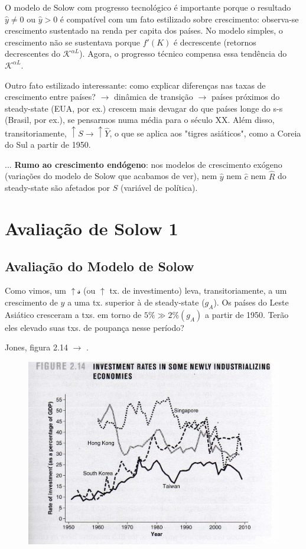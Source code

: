 \documentclass[a4paper,12pt]{article}[abntex2]
\begin{document}
O modelo de Solow com progresso tecnológico é importante porque o resultado \(\hat{y} \neq 0\) ou \(\hat{y} > 0\) é compatível com um fato estilizado sobre crescimento: observa-se crescimento sustentado na renda per capita dos países. No modelo simples, o crescimento não se sustentava porque \( f'(K) \) é decrescente (retornos decrescentes do \( \mathcal{K}^{\alpha L} \)). Agora, o progresso técnico compensa essa tendência do \( \mathcal{K}^{\alpha L} \).

Outro fato estilizado interessante: como explicar diferenças nas taxas de crescimento entre países? \(\rightarrow\) dinâmica de transição \(\rightarrow\) países próximos do steady-state (EUA, por ex.) crescem mais devagar do que países longe do s-s (Brasil, por ex.), se pensarmos numa média para o século XX. Além disso, transitoriamente, \(\uparrow S \rightarrow \uparrow \hat{Y}\), o que se aplica aos "tigres asiáticos", como a Coreia do Sul a partir de 1950.

\(...\) \textbf{Rumo ao crescimento endógeno}: nos modelos de crescimento exógeno (variações do modelo de Solow que acabamos de ver), nem \(\hat{y}\) nem \(\hat{c}\) nem \(\hat{R}\) do steady-state são afetados por \( S \) (variável de política).

\newpage
\section{\textbf{Avaliação de Solow 1}}
\subsection{\textbf{Avaliação do Modelo de Solow}}

Como vimos, um \( \uparrow \mathcal{s} \) (ou \( \uparrow \) tx. de investimento) leva, transitoriamente, a um crescimento de \( y \) a uma tx. superior à de steady-state (\( g_A \)). Os países do Leste Asiático cresceram a txs. em torno de \( 5\% \gg 2\% (g_A) \) a partir de 1950. Terão eles elevado suas txs. de poupança nesse período?

Jones, figura 2.14 \(\rightarrow\) . 

\begin{figure}[H]
    \centering
    \includegraphics[width=0.7\linewidth]{Imagens/a12i2.png}
\end{figure}
\end{document}
